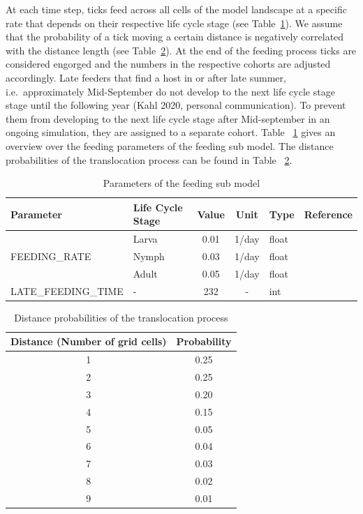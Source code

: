 \documentclass[a4paper, 11pt]{scrartcl}
\begin{document}
At each time step, ticks feed across all cells of the model landscape at a specific rate that depends on their respective life cycle stage (see Table~\ref{tab:feeding_parameters}). We assume that the probability of a tick moving a certain distance is negatively correlated with the distance length (see Table~\ref{tab:distance_probabilities}). At the end of the feeding process ticks are considered engorged and the numbers in the respective cohorts are adjusted accordingly. Late feeders that find a host in or after late summer, i.e.\ approximately Mid-September do not develop to the next life cycle stage stage until the following year (Kahl 2020, personal communication). To prevent them from developing to the next life cycle stage after Mid-september in an ongoing simulation, they are assigned to a separate cohort. Table ~\ref{tab:feeding_parameters} gives an overview over the feeding parameters of the feeding sub model. The distance probabilities of the translocation process can be found in Table ~\ref{tab:distance_probabilities}.


\begin{table}[h!]
\caption{Parameters of the feeding sub model}
\label{tab:feeding_parameters}
\begin{tabular}{@{}llccll@{}}
\toprule
\textbf{Parameter} & \textbf{Life Cycle Stage} & \textbf{Value} & \textbf{Unit} & \textbf{Type}	& \textbf{Reference} \\
\midrule
\multirow{3}{*}{\tiny{FEEDING\_RATE}} & Larva	& 0.01	& 1/day & float	 & 		\\
									  & Nymph	& 0.03	& 1/day & float	 &		\\
									  & Adult	& 0.05	& 1/day & float	 &		\\

\tiny{LATE\_FEEDING\_TIME}			  & - & 232 & -	& int	 & ~\cite{tba}  \\
\bottomrule
\end{tabular}
\end{table}

\begin{table}[h!]
\caption{Distance probabilities of the translocation process}
\label{tab:distance_probabilities}
\begin{tabular}{@{}cc@{}}
\toprule
\textbf{Distance (Number of grid cells)}	& \textbf{Probability}	\\
\midrule
1 	& 0.25 \\
2	& 0.25 \\
3	& 0.20 \\
4	& 0.15 \\
5	& 0.05 \\
6	& 0.04 \\
7	& 0.03 \\
8	& 0.02 \\
9	& 0.01 \\
\bottomrule
\end{tabular}
\end{table}
\end{document}
